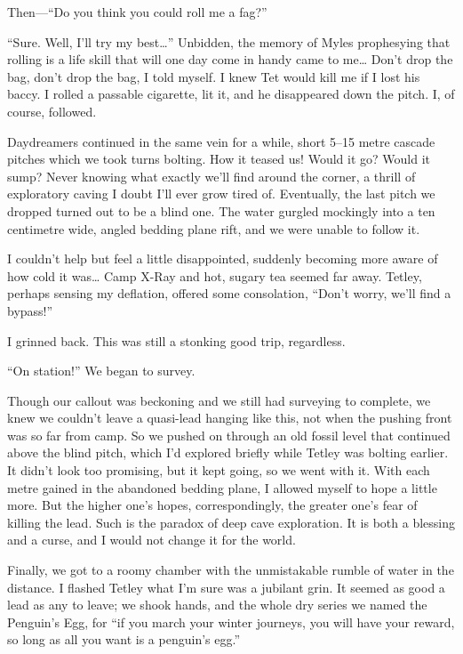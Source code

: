 Then---``Do you think you could roll me a fag?''

``Sure. Well, I'll try my best\ldots{}'' Unbidden, the memory of Myles
prophesying that rolling is a life skill that will one day come in handy
came to me\ldots{} Don't drop the bag, don't drop the bag, I told
myself. I knew Tet would kill me if I lost his baccy. I rolled a
passable cigarette, lit it, and he disappeared down the pitch. I, of
course, followed.

Daydreamers continued in the same vein for a while, short 5--15 metre
cascade pitches which we took turns bolting. How it teased us! Would it
go? Would it sump? Never knowing what exactly we'll find around the
corner, a thrill of exploratory caving I doubt I'll ever grow tired of.
Eventually, the last pitch we dropped turned out to be a blind one. The
water gurgled mockingly into a ten centimetre wide, angled bedding plane
rift, and we were unable to follow it.

I couldn't help but feel a little disappointed, suddenly becoming more
aware of how cold it was\ldots{} Camp X-Ray and hot, sugary tea seemed
far away. Tetley, perhaps sensing my deflation, offered some
consolation, ``Don't worry, we'll find a bypass!''

I grinned back. This was still a stonking good trip, regardless.

``On station!'' We began to survey.

Though our callout was beckoning and we still had surveying to complete,
we knew we couldn't leave a quasi-lead hanging like this, not when the
pushing front was so far from camp. So we pushed on through an old
fossil level that continued above the blind pitch, which I'd explored
briefly while Tetley was bolting earlier. It didn't look too promising,
but it kept going, so we went with it. With each metre gained in the
abandoned bedding plane, I allowed myself to hope a little more. But the
higher one's hopes, correspondingly, the greater one's fear of killing
the lead. Such is the paradox of deep cave exploration. It is both a
blessing and a curse, and I would not change it for the world.

Finally, we got to a roomy chamber with the unmistakable rumble of water
in the distance. I flashed Tetley what I'm sure was a jubilant grin. It
seemed as good a lead as any to leave; we shook hands, and the whole dry
series we named the Penguin's Egg, for ``if you march your winter
journeys, you will have your reward, so long as all you want is a
penguin's egg.''

